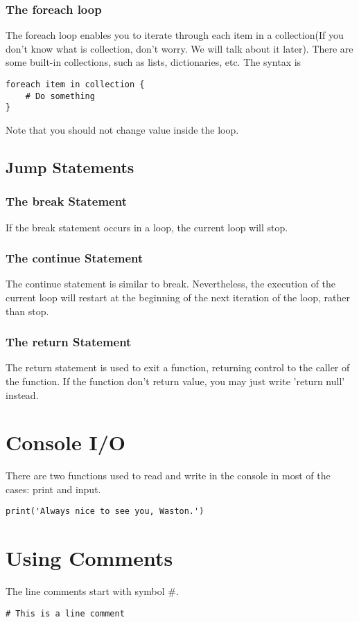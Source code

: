 \subsubsection{The foreach loop}
The foreach loop enables you to iterate through each item in a collection(If you don't know what is collection, don't worry. We will talk about it later). There are some built-in collections, such as lists, dictionaries, etc. The syntax is
\begin{lstlisting}
foreach item in collection {
	# Do something
}
\end{lstlisting}
Note that you should not change value inside the loop.

\subsection{Jump Statements}
\subsubsection{The break Statement}
If the break statement occurs in a loop, the current loop will stop.
\subsubsection{The continue Statement}
The continue statement is similar to break. Nevertheless, the execution of the current loop will restart at the beginning of the next iteration of the loop, rather than stop.
\subsubsection{The return Statement}
The return statement is used to exit a function, returning control to the caller of the function. If the function don't return value, you may just write 'return null' instead.

\section{Console I/O}
There are two functions used to read and write in the console in most of the cases: print and input. 
\begin{lstlisting}
print('Always nice to see you, Waston.')
\end{lstlisting}

\section{Using Comments}
The line comments start with symbol \#.
\begin{lstlisting}
# This is a line comment
\end{lstlisting}

